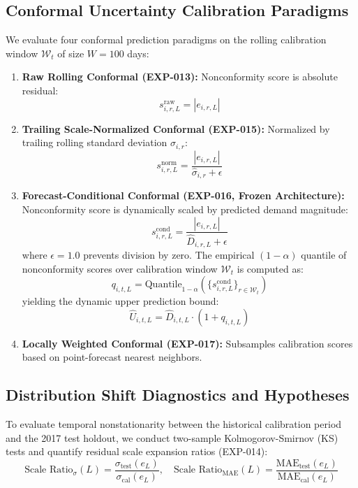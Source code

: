 \documentclass[11pt,a4paper]{article}
\begin{document}
\subsection{Conformal Uncertainty Calibration Paradigms}
\label{sec:meth_conformal}
We evaluate four conformal prediction paradigms on the rolling calibration window $\mathcal{W}_t$ of size $W=100$ days:
\begin{enumerate}
    \item \textbf{Raw Rolling Conformal (EXP-013):} Nonconformity score is absolute residual:
    \begin{equation}
    s_{i,r,L}^{\text{raw}} = |e_{i,r,L}|
    \label{eq:raw_score}
    \end{equation}
    \item \textbf{Trailing Scale-Normalized Conformal (EXP-015):} Normalized by trailing rolling standard deviation $\hat{\sigma}_{i,r}$:
    \begin{equation}
    s_{i,r,L}^{\text{norm}} = \frac{|e_{i,r,L}|}{\hat{\sigma}_{i,r} + \epsilon}
    \label{eq:norm_score}
    \end{equation}
    \item \textbf{Forecast-Conditional Conformal (EXP-016, Frozen Architecture):} Nonconformity score is dynamically scaled by predicted demand magnitude:
    \begin{equation}
    s_{i,r,L}^{\text{cond}} = \frac{|e_{i,r,L}|}{\hat{D}_{i,r,L} + \epsilon}
    \label{eq:cond_score}
    \end{equation}
    where $\epsilon = 1.0$ prevents division by zero. The empirical $(1-\alpha)$ quantile of nonconformity scores over calibration window $\mathcal{W}_t$ is computed as:
    \begin{equation}
    q_{i,t,L} = \text{Quantile}_{1-\alpha}\left( \{s_{i,r,L}^{\text{cond}}\}_{r \in \mathcal{W}_t} \right)
    \label{eq:quantile_calc}
    \end{equation}
    yielding the dynamic upper prediction bound:
    \begin{equation}
    \hat{U}_{i,t,L} = \hat{D}_{i,t,L} \cdot (1 + q_{i,t,L})
    \label{eq:upper_bound}
    \end{equation}
    \item \textbf{Locally Weighted Conformal (EXP-017):} Subsamples calibration scores based on point-forecast nearest neighbors.
\end{enumerate}

\subsection{Distribution Shift Diagnostics and Hypotheses}
\label{sec:meth_shift}
To evaluate temporal nonstationarity between the historical calibration period and the 2017 test holdout, we conduct two-sample Kolmogorov-Smirnov (KS) tests and quantify residual scale expansion ratios (EXP-014):
\begin{equation}
\text{Scale Ratio}_{\sigma}(L) = \frac{\sigma_{\text{test}}(e_L)}{\sigma_{\text{cal}}(e_L)}, \quad \text{Scale Ratio}_{\text{MAE}}(L) = \frac{\text{MAE}_{\text{test}}(e_L)}{\text{MAE}_{\text{cal}}(e_L)}
\label{eq:scale_ratios}
\end{equation}
\end{document}
